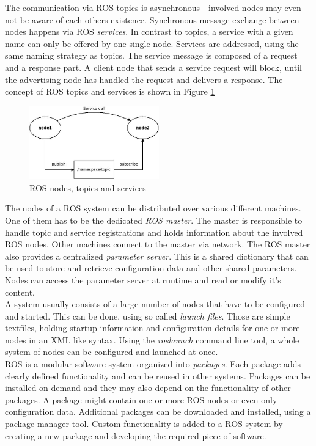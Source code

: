 The communication via ROS topics is asynchronous - involved nodes may even not be aware of each others existence. Synchronous message exchange between nodes happens via ROS \emph{services}. In contrast to topics, a service with a given name can only be offered by one single node. Services are addressed, using the same naming strategy as topics. The service message is composed of a request and a response part. A client node that sends a service request will block, until the advertising node has handled the request and delivers a response. The concept of ROS topics and services is shown in Figure \ref{fig:ros_concept}
\begin{figure}[h]
	\centering
  \includegraphics[width=0.5\textwidth]{images/ros_concept.jpg}
	\caption{ROS nodes, topics and services}
	\label{fig:ros_concept}
\end{figure}

The nodes of a ROS system can be distributed over various different machines. One of them has to be the dedicated \emph{ROS master}. The master is responsible to handle topic and service registrations and holds information about the involved ROS nodes. Other machines connect to the master via network. The ROS master also provides a centralized \emph{parameter server}. This is a shared dictionary that can be used to store and retrieve configuration data and other shared parameters. Nodes can access the parameter server at runtime and read or modify it's content. \\

A system usually consists of a large number of nodes that have to be configured and started. This can be done, using so called \emph{launch files}. Those are simple textfiles, holding startup information and configuration details for one or more nodes in an XML like syntax. Using the \emph{roslaunch} command line tool, a whole system of nodes can be configured and launched at once. \\

ROS is a modular software system organized into \emph{packages}. Each package adds clearly defined functionality and can be reused in other systems. Packages can be installed on demand and they may also depend on the functionality of other packages. A package might contain one or more ROS nodes or even only configuration data. Additional packages can be downloaded and installed, using a package manager tool.
Custom functionality is added to a ROS system by creating a new package and developing the required piece of software.

